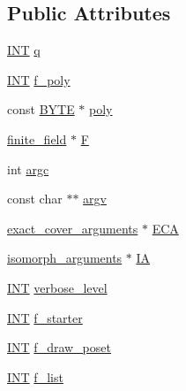 \subsection*{Public Attributes}
\begin{DoxyCompactItemize}
\item 
\mbox{\hyperlink{galois_8h_a09fddde158a3a20bd2dcadb609de11dc}{I\+NT}} \mbox{\hyperlink{classarc__generator_a83005f54a2ade0ebc82dfd2aa0b363bd}{q}}
\item 
\mbox{\hyperlink{galois_8h_a09fddde158a3a20bd2dcadb609de11dc}{I\+NT}} \mbox{\hyperlink{classarc__generator_aea90d1301f59a046b2bfc4283a767c9d}{f\+\_\+poly}}
\item 
const \mbox{\hyperlink{galois_8h_ab6cc7b4aeb6ea31aba2b3fbfc83ff5e6}{B\+Y\+TE}} $\ast$ \mbox{\hyperlink{classarc__generator_a0638b50ee024d14841f49961fa6eeff1}{poly}}
\item 
\mbox{\hyperlink{classfinite__field}{finite\+\_\+field}} $\ast$ \mbox{\hyperlink{classarc__generator_a7336d436d54e462d2ce822a518f05195}{F}}
\item 
int \mbox{\hyperlink{classarc__generator_a259ae1391f0b81ade1c0786166a794aa}{argc}}
\item 
const char $\ast$$\ast$ \mbox{\hyperlink{classarc__generator_aff62e9c019a7428f31ca5855f3d9213b}{argv}}
\item 
\mbox{\hyperlink{classexact__cover__arguments}{exact\+\_\+cover\+\_\+arguments}} $\ast$ \mbox{\hyperlink{classarc__generator_a0697a2da0f8ee46b1efa8ee15ca7ac48}{E\+CA}}
\item 
\mbox{\hyperlink{classisomorph__arguments}{isomorph\+\_\+arguments}} $\ast$ \mbox{\hyperlink{classarc__generator_a03058de2e00e2f054da9aa3a3a6926ba}{IA}}
\item 
\mbox{\hyperlink{galois_8h_a09fddde158a3a20bd2dcadb609de11dc}{I\+NT}} \mbox{\hyperlink{classarc__generator_a38cb55f50fe5c7965368f1ff8ea8b017}{verbose\+\_\+level}}
\item 
\mbox{\hyperlink{galois_8h_a09fddde158a3a20bd2dcadb609de11dc}{I\+NT}} \mbox{\hyperlink{classarc__generator_a43e039b98e0a6062cd02ded811596dc4}{f\+\_\+starter}}
\item 
\mbox{\hyperlink{galois_8h_a09fddde158a3a20bd2dcadb609de11dc}{I\+NT}} \mbox{\hyperlink{classarc__generator_a125f15a6332e5a4e8017a5cc94e2b55d}{f\+\_\+draw\+\_\+poset}}
\item 
\mbox{\hyperlink{galois_8h_a09fddde158a3a20bd2dcadb609de11dc}{I\+NT}} \mbox{\hyperlink{classarc__generator_a86b98a13e0b864778c376f1c449ffcbd}{f\+\_\+list}}
\item 
$$
\end{DoxyCompactItemize}
